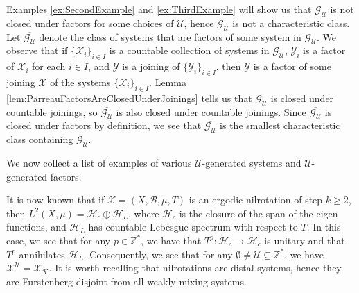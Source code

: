 \documentclass[graybox]{svmult}
\theoremstyle{definition}
\begin{document}
\begin{remark}\label{rem:QuasiCharacteristicClass}
    Examples \ref{ex:SecondExample} and \ref{ex:ThirdExample} will show us that $\mathcal{G}_{\mathcal{U}}$ is not closed under factors for some choices of $\mathcal{U}$, hence $\mathcal{G}_{\mathcal{U}}$ is not a characteristic class.
    Let $\overline{\mathcal G_{\mathcal{U}}}$ denote the class of systems that are factors of some system in $\mathcal{G}_{\mathcal{U}}$. 
    We observe that if $\{\mathcal{X}_i\}_{i \in I}$ is a countable collection of systems in $\mathcal{G}_{\mathcal{U}}$, $\mathcal{Y}_i$ is a factor of $\mathcal{X}_i$ for each $i \in I$, and $\mathcal{Y}$ is a joining of $\{\mathcal{Y}_i\}_{i \in I}$, then $\mathcal{Y}$ is a factor of some joining $\mathcal{X}$ of the systems $\{\mathcal{X}_i\}_{i \in I}$.
    Lemma \ref{lem:ParreauFactorsAreClosedUnderJoinings} tells us that $\mathcal{G}_{\mathcal{U}}$ is closed under countable joinings, so $\overline{\mathcal{G}_{\mathcal{U}}}$ is also closed under countable joinings.
    Since $\overline{\mathcal{G}_{\mathcal{U}}}$ is closed under factors by definition, we see that $\overline{\mathcal{G}_{\mathcal{U}}}$ is the smallest characteristic class containing $\mathcal{G}_\mathcal{U}$.
\end{remark}

We now collect a list of examples of various ${\mathcal{U}}$-generated systems and ${\mathcal{U}}$-generated factors.

\begin{example}[Nilsystems]\label{ex:Nilsystems}
    It is now known \cite{SpectrumOfNilsystems} that if $\mathcal{X} = (X,\mathscr{B},\mu,T)$ is an ergodic nilrotation of step $k \ge 2$, then $L^2(X,\mu) = \mathcal{H}_c\oplus\mathcal{H}_L$, where $\mathcal{H}_c$ is the closure of the span of the eigen functions, and $\mathcal{H}_L$ has countable Lebesgue spectrum with respect to $T$.
    In this case, we see that for any $p \in \mathbb{Z}^*$, we have that $T^p:\mathcal{H}_c\rightarrow\mathcal{H}_c$ is unitary and that $T^p$ annihilates $\mathcal{H}_L$.
    Consequently, we see that for any $\emptyset \neq \mathcal{U} \subseteq \mathbb{Z}^*$, we have $\mathcal{X}^\mathcal{U} = \mathcal{X}_\mathcal{K}$.
    It is worth recalling that nilrotations are distal systems, hence they are Furstenberg disjoint from all weakly mixing systems.
\end{example}
\end{document}
